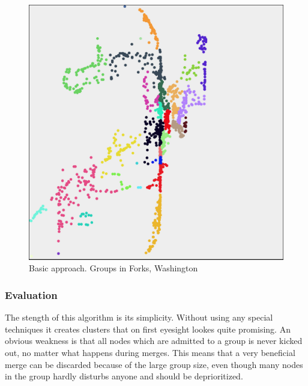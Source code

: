 \begin{figure}[h]
	\center
	\includegraphics[scale=0.46]{Images/computations/BASICForks.jpg}
	\caption{Basic approach. Groups in Forks, Washington}
	\label{fig:basic_forks}
\end{figure}

\subsubsection{Evaluation}
The stength of this algorithm is its simplicity. Without using any special techniques it creates clusters that on first eyesight lookes quite promising. 
An obvious weakness is that all nodes which are admitted to a group is never kicked out, no matter what happens during merges. This means that a very beneficial 
merge can be discarded because of the large group size, even though many nodes in the group hardly disturbs anyone and should be deprioritized. 


%

